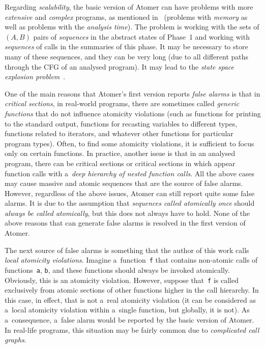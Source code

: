Regarding \emph{scalability}, the basic version of Atomer can have problems with more \emph{extensive} and \emph{complex} programs, as mentioned in~\cite{harmimBP} (problems with \emph{memory} as well as problems with the \emph{analysis time}). The problem is working with the sets of $ (A, B) $ pairs of \emph{sequences} in the abstract states of Phase~1 and working with \emph{sequences} of calls in the summaries of this phase. It may be necessary to store many of these sequences, and they can be very long (due to all different paths through the CFG of an analysed program). It may lead to the \emph{state space explosion problem}~\cite{stateExpl}.

One of the main reasons that Atomer's first version reports \emph{false alarms} is that in \emph{critical sections}, in real-world programs, there are sometimes called \emph{generic functions} that do not influence atomicity violations (such as functions for printing to the standard output, functions for recasting variables to different types, functions related to iterators, and whatever other  functions for particular program types). Often, to find some atomicity violations, it is sufficient to focus only on certain  functions. In practice, another issue is that in an analysed program, there can be  critical sections or critical sections in which appear function calls with a~\emph{deep hierarchy of nested function calls}. All the above cases may cause massive and  atomic sequences that are the source of false alarms. However, regardless of the above issues, Atomer can still report quite some false alarms. It is due to the assumption that \emph{sequences called atomically once} should \emph{always be called atomically}, but this does not always have to hold. None of the above reasons that can generate false alarms is resolved in the first version of Atomer.

The next source of false alarms is something that the author of this work calls \emph{local atomicity violations}. Imagine a~function~\texttt{f} that contains non-atomic calls of functions~\texttt{a}, \texttt{b}, and these functions should always be invoked atomically. Obviously, this is an atomicity violation. However, suppose that~\texttt{f} is called exclusively from atomic sections of other functions higher in the call hierarchy. In this case, in effect, that is not a~real atomicity violation (it can be considered as a~local atomicity violation within a~single function, but globally, it is not). As a~consequence, a~false alarm would be reported by the basic version of Atomer. In real-life programs, this situation may be fairly common due to \emph{complicated call graphs}.

